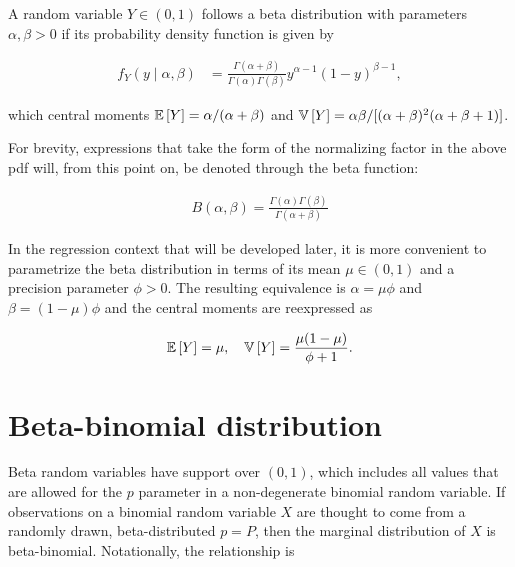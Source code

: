 A random variable $Y \in (0,1)$ follows a beta distribution with parameters $\alpha, \beta > 0$ if its probability density function is given by

\begin{equation}
\begin{split}
f_{Y}(y \mid \alpha, \beta)
&= \frac{\Gamma(\alpha+\beta)}{\Gamma(\alpha)\Gamma(\beta)}y^{\alpha-1}(1-y)^{\beta-1},
\end{split}
\end{equation}

which central moments ${\mathbb E}\left[ Y \right] = \alpha / (\alpha+ \beta)$ and ${\mathbb V}\left[ Y \right] = \alpha \beta/[(\alpha+\beta)^2(\alpha+\beta+1)]$.

For brevity, expressions that take the form of the normalizing factor in the above pdf will, from this point on, be denoted through the beta function:

\begin{equation}
\label{beta-function}
\begin{split}
B(\alpha, \beta) = \frac{\Gamma(\alpha)\Gamma(\beta)}{\Gamma(\alpha+\beta)}
\end{split}
\end{equation}

In the regression context that will be developed later, it is more convenient to parametrize the beta distribution in terms of its mean $\mu \in (0,1)$ and a precision parameter $\phi > 0$. The resulting equivalence is  $\alpha = \mu\phi$ and $\beta = (1-\mu)\phi$ and the central moments are reexpressed as

\begin{equation}
\begin{split}
{\mathbb E}\left[ Y \right] = \mu, \quad {\mathbb V}\left[ Y \right] = \frac{\mu(1-\mu)}{\phi+1}.
\end{split}
\end{equation}

\section{Beta-binomial distribution}
\label{sec:bbin-dist}

Beta random variables have support over $(0,1)$, which includes all values that are allowed for the $p$ parameter in a non-degenerate binomial random variable. If observations on a binomial random variable $X$ are thought to come from a randomly drawn, beta-distributed $p=P$, then the marginal distribution of $X$ is beta-binomial. Notationally, the relationship is

